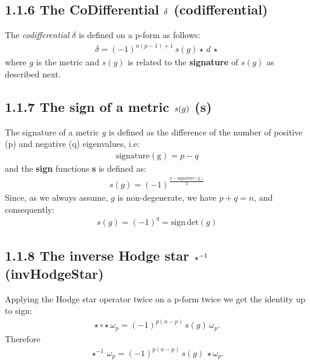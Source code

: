 \documentclass[letterpaper,10pt,english]{sphinxmanual}
\begin{document}
\subsection{1.1.6 The CoDifferential \protect\(\delta\protect\) (\textbf{codifferential})}
\label{section-1.0:the-codifferential-codifferential}
The \emph{codifferential} \(\delta\) is defined on a p-form as follows:
\begin{equation*}
\begin{split}\delta = (-1)^{n(p-1)+1}\,s(g) \star\,d\,\star\end{split}
\end{equation*}
where \(g\) is the metric and \(s(g)\) is related to the
\textbf{signature} of \(s(g)\) as described next.


\subsection{1.1.7 The sign of a metric  \protect\(s(g)\protect\) (\textbf{s})}
\label{section-1.0:the-sign-of-a-metric-s}
The signature of a metric \(g\) is defined as the difference of
the number of positive (p) and negative (q) eigenvalues, i.e:
\begin{equation*}
\begin{split}\mathrm{signature(g)} = p - q\end{split}
\end{equation*}
and the \textbf{sign} functions \textbf{s} is defined as:
\begin{equation*}
\begin{split}s(g) = (-1)^{\frac{n -\mathrm{signature(g)}}{2}}\end{split}
\end{equation*}
Since, as we always assume, \(g\)  is non-degenerate, we have
\(p+q=n\), and consequently:
\begin{equation*}
\begin{split}s(g) = (-1)^{q} = \mathrm{sign}\, \mathrm{det}(g)\end{split}
\end{equation*}

\subsection{1.1.8 The inverse Hodge star \protect\(\star^{-1}\protect\) (\textbf{invHodgeStar})}
\label{section-1.0:the-inverse-hodge-star-invhodgestar}
Applying the Hodge star operator twice on a p-form twice we get
the identity up to sign:
\begin{equation*}
\begin{split}\star\circ\star\, \omega_p = (-1)^{p(n-p)}\,s(g)\,\omega_p.\end{split}
\end{equation*}
Therefore
\begin{equation*}
\begin{split}\star^{-1}\,\omega_p = (-1)^{p(n-p)}\,s(g)\,\star\omega_p.\end{split}
\end{equation*}
\end{document}
